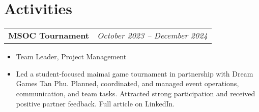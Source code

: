 \documentclass[a4paper,11pt]{article}
\makeatletter
\newenvironment{joblong}[2]
    {
    \begin{tabularx}{\linewidth}{@{}l r@{}}
    \textbf{#1} & #2 \\[2pt]
    \end{tabularx}
    \begin{itemize}[nosep,leftmargin=1.5em,itemsep=2pt,label=--]
    }
    {
    \end{itemize}
    }
\makeatother
\begin{document}
\section{Activities}
\begin{joblong}{MSOC Tournament}{\hspace*{0.5\linewidth}\small\textit{October 2023 -- December 2024}}
\item Team Leader, Project Management
\item Led a student-focused maimai game tournament in partnership with Dream Games Tan Phu. Planned, coordinated, and managed event operations, communication, and team tasks. Attracted strong participation and received positive partner feedback. Full article on LinkedIn.
\end{joblong}



\vspace*{\fill}
\end{document}
